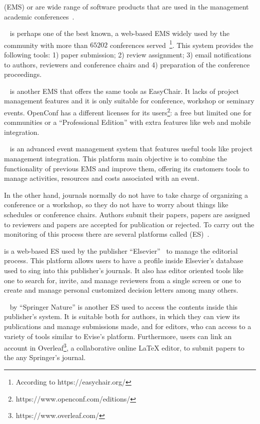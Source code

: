  (EMS) or  are
wide range of software products that are used in the management academic
conferences~\cite{azar2006academic}.

~\cite{easychair} is perhaps one of the best known, a web-based
EMS widely used by the community with more than $65202$ conferences
served~\footnote{According to https://easychair.org/}. This system provides the
following tools: 1) paper submission; 2) review assignment; 3) email
notifications to authors, reviewers and conference chairs and 4) preparation of
the conference proceedings.

~\cite{openconf} is another EMS that offers the same tools as
EasyChair. It lacks of project management features and it is only suitable for
conference, workshop or seminary events. OpenConf has a different licenses for
its users\footnote{https://www.openconf.com/editions/}: a free but limited one
for communities or a ``Professional Edition'' with extra features like web and
mobile integration.

~\cite{paulo2011aems} is an advanced event management system that
features useful tools like project management integration. This platform main
objective is to combine the functionality of previous EMS and improve them,
offering its customers tools to manage activities, resources and costs
associated with an event.

In the other hand, journals normally do not have to take charge of organizing a
conference or a workshop, so they do not have to worry about things like
schedules or conference chairs. Authors submit their papers, papers are assigned
to reviewers and papers are accepted for publication or rejected. To carry out
the monitoring of this process there are several platforms called  (ES)~\cite{Lev2016}.

 is a web-based ES used by the publisher ``Elsevier''~\cite{evise} to
manage the editorial process. This platform allows users to have a profile
inside Elsevier's database used to sing into this publisher's journals. It also
has editor oriented tools like one to search for, invite, and manage reviewers
from a single screen or one to create and manage personal customized decision
letters among many others.

~\cite{myspringer} by ``Springer Nature'' is another ES used to
access the contents inside this publisher's system. It is suitable both for
authors, in which they can view its publications and manage submissions made,
and for editors, who can access to a variety of tools similar to Evise's
platform. Furthermore, users can link an account in
Overleaf\footnote{https://www.overleaf.com/}, a collaborative online \LaTeX
editor, to submit papers to the any Springer's journal.

